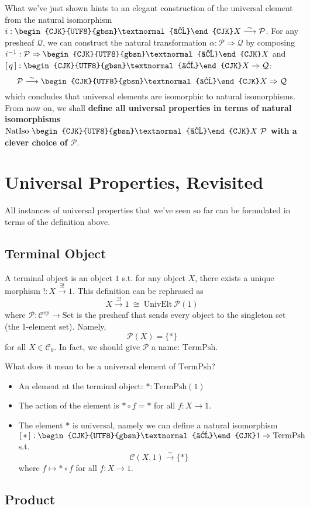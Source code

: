 \documentclass[12pt]{article}
\theoremstyle{definition}
\theoremstyle{remark}
\newcommand{\cat}[1]{\mathcal{#1}}
\newcommand{\psh}[1]{\mathcal{#1}}
\newcommand{\Set}{\mathrm{Set}}
\newcommand{\yo}{\begin{CJK}{UTF8}{gbsn}\textnormal{よ}\end{CJK}}
\newcommand{\yotrans}[1]{\lbrack\,#1\,\rbrack}
\newcommand{\natrans}{\Rightarrow}
\newcommand{\natiso}{\overset{\sim}{\longrightarrow}}
\begin{document}
What we've just shown hints to an elegant construction of the universal element from the natural isomorphism $i : \yo X \natiso \psh{P}$. For any presheaf $\psh{Q}$, we can construct the natural transformation $\alpha: \psh{P} \natrans \psh{Q}$ by composing $i^{-1}: \psh{P} \natrans \yo X$ and $\yotrans{q}: \yo X \natrans \psh{Q}$:
$$
\psh{P} \natiso \yo X \natrans \psh{Q}
$$
which concludes that universal elements are isomorphic to natural isomorphisms. From now on, we shall \textbf{define all universal properties in terms of natural isomorphisms $\mathrm{NatIso}~\yo X~\psh{P}$ with a clever choice of $\psh{P}$}.

\section{Universal Properties, Revisited}

All instances of universal properties that we've seen so far can be formulated in terms of the definition above.

\subsection*{Terminal Object}

A terminal object is an object $1$ s.t. for any object $X$, there exists a unique morphism $! : X \overset{\exists!}{\to} 1$. This definition can be rephrased as
$$
  X \overset{\exists!}{\to} 1~\cong~\mathrm{UnivElt}~\psh{P}(1)
$$
where $\psh{P} : \cat{C}^{op} \to \Set$ is the presheaf that sends every object to the singleton set (the 1-element set). Namely,
$$
\psh{P}(X) = \{*\}
$$
for all $X \in \cat{C}_0$. In fact, we should give $\psh{P}$ a name: $\mathrm{TermPsh}$.

What does it mean to be a universal element of $\mathrm{TermPsh}$?
\begin{itemize}
  \item An element at the terminal object: $*: \mathrm{TermPsh}(1)$
  \item The action of the element is $* \circ f = *$ for all $f: X \to 1$.
  \item The element $*$ is universal, namely we can define a natural isomorphism $\yotrans{*}: \yo 1 \natrans \mathrm{TermPsh}$ s.t.
  $$
    \cat{C}(X, 1) \natiso \{*\}
  $$
  where $f \mapsto * \circ f$ for all $f: X \to 1$.
\end{itemize}

\subsection*{Product}
\end{document}
